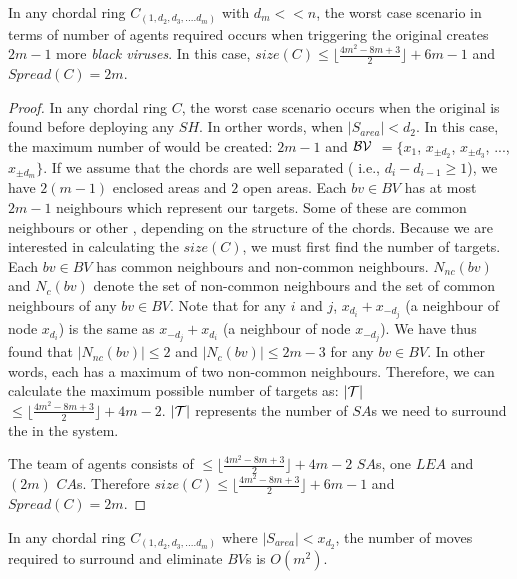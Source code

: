 \begin{theorem}
In any chordal ring $C_(1,d_2,d_3,....d_m)$ with $d_m<<n$, the worst case scenario in terms of number of agents required occurs when triggering the original \bv creates $2m-1$ more {\it black viruses}. In this case,  $size(C)\leq  \lfloor \frac {4m^2-8m+3}{2} \rfloor +6m-1$ and $Spread(C)=2m$.
\end{theorem}

\begin{proof}


In any chordal ring $C$, the worst case scenario occurs when the original \bv is found before deploying any $SH$. In orther words, 
when $|S_{area}|<d_2$. In this case, the maximum number of \bvs would be created: $ 2m-1$ and $\cal BV$ $=\{x_{1}$, $x_{\pm d_2}$, $x_{\pm d_3}$, ..., $x_{\pm d_m}\}$. If we assume that the chords are well separated ( i.e., $d_i-d_{i-1}\ge1$), we have $2(m-1)$ enclosed areas and $2$ open areas.
Each $bv\in BV$ has at most $2m-1$ neighbours which represent our targets. Some of these are common neighbours or other \bvs, depending on the structure of  the chords. Because we are interested in calculating the $size(C)$, we must first find the number of targets. Each $bv \in BV$ has common neighbours and non-common neighbours. $N_{nc}(bv)$ and $N_{c}(bv)$ denote the set of non-common neighbours and the set of common neighbours of any $bv \in BV$. Note that for any $i$ and $j$, $x_{d_i}+x_{-d_j}$ (a neighbour of node $x_{d_i}$) is the same as $x_{-d_j}+x_{d_i}$ (a neighbour of node $x_{-d_j}$). We have thus found that $|N_{nc}(bv)|\leq2$ and $|N_{c}(bv)|\leq 2m-3$ for any $bv \in BV$. In other words, each \bv has a maximum of two non-common neighbours.  Therefore, we can calculate the maximum possible number of targets as: $|\cal T|$$\leq \lfloor \frac {4m^2-8m+3}{2} \rfloor +4m-2$. $|\cal T|$ represents the number of $SA$s we need to surround the \bvs in the system.

The team of agents  consists of $\leq \lfloor \frac {4m^2-8m+3}{2} \rfloor +4m-2$ $SA$s, one $LEA$ and $(2m)$ $CA$s. Therefore $size(C)\leq  \lfloor \frac {4m^2-8m+3}{2} \rfloor +6m-1$ and $Spread(C)=2m$.

\end{proof}


\begin{theorem}

In any chordal ring  $C_(1,d_2,d_3,....d_m)$ where $\left\vert{S_{area}}\right\vert < x_{d_2}$,  the number of moves required to surround and eliminate $BV$s  is $O( {m^2} )$.
\end{theorem}

